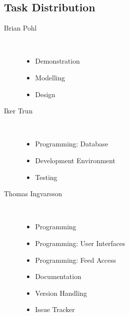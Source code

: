 \subsection{Task Distribution}
\begin{description}
  \item[Brian Pohl] \hfill \\
  	\begin{itemize}
  	\item Demonstration
  	\item Modelling
  	\item Design
	\end{itemize}
  \item[Iker Trun] \hfill \\
    \begin{itemize}
  	\item Programming: Database
  	\item Development Environment
  	\item Testing
	\end{itemize}
  \item[Thomas Ingvarsson] \hfill \\
    \begin{itemize}
  	\item Programming
  	\item Programming: User Interfaces
  	\item Programming: Feed Access
  	\item Documentation
  	\item Version Handling
  	\item Issue Tracker
	\end{itemize}
\end{description}